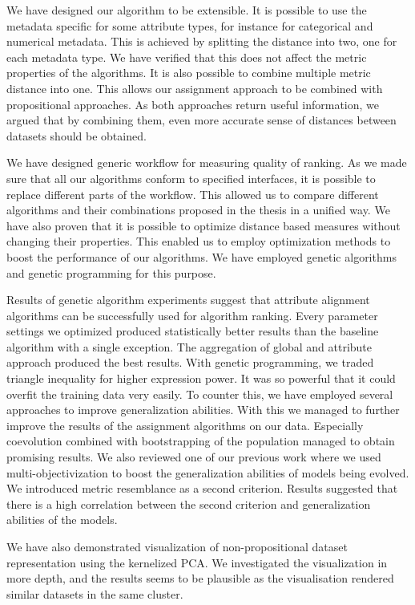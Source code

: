 \documentclass{article}
\begin{document}
\begin{refsegment}
We have designed our algorithm to be extensible. It is possible to use the metadata specific for some attribute types, for instance for categorical and numerical metadata. This is achieved by splitting the distance into two, one for each metadata type. We have verified that this does not affect the metric properties of the algorithms. It is also possible to combine multiple metric distance into one. This allows our assignment approach to be combined with propositional approaches. As both approaches return useful information, we argued that by combining them, even more accurate sense of distances between datasets should be obtained.

We have designed generic workflow for measuring quality of ranking. As we made sure that all our algorithms conform to specified interfaces, it is possible to replace different parts of the workflow. This allowed us to compare different algorithms and their combinations proposed in the thesis in a unified way. We have also proven that it is possible to optimize distance based measures without changing their properties. This enabled us to employ optimization methods to boost the performance of our algorithms. We have employed genetic algorithms and genetic programming for this purpose. 

Results of genetic algorithm experiments suggest that attribute alignment algorithms can be successfully used for algorithm ranking. Every parameter settings we optimized produced statistically better results than the baseline algorithm with a single exception. The aggregation of global and attribute approach produced the best results.
With genetic programming, we traded triangle inequality for higher expression power. It was so powerful that it could overfit the training data very easily. To counter this, we have employed several approaches to improve generalization abilities. With this we managed to further improve the results of the assignment algorithms on our data. Especially coevolution combined with bootstrapping of the population managed to obtain promising results. We also reviewed one of our previous work where we used multi-objectivization to boost the generalization abilities of models being evolved. We introduced metric resemblance as a second criterion. Results suggested that there is a high correlation between the second criterion and generalization abilities of the models.

We have also demonstrated visualization of non-propositional dataset representation using the kernelized PCA. We investigated the visualization in more depth, and the results seems to be plausible as the visualisation rendered similar datasets in the same cluster.


\end{refsegment}
\end{document}
